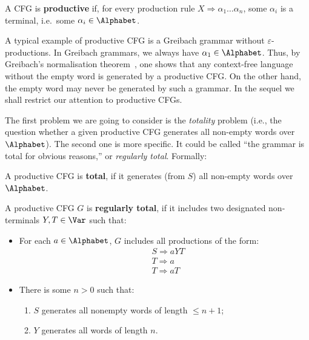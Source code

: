 \documentclass[runningheads]{amsart}
\begin{document}
\begin{definition}
A CFG is \textbf{productive} if, for every production rule $X \Rightarrow \alpha_1 \ldots \alpha_n$, some $\alpha_i$ is a terminal, i.e.\ some $\alpha_i \in \Alphabet$.
\end{definition}

A typical example of productive CFG is a Greibach grammar without $\varepsilon$-pro\-duc\-ti\-ons. In Greibach grammars, we always have $\alpha_1 \in \Alphabet$. Thus, by Greibach's normalisation theorem~\cite{Greibach1965}, one shows that any context-free language without the empty word is generated by a productive CFG. On the other hand, the empty word may never be generated by such a grammar.
In the sequel we shall restrict our attention to productive CFGs.

The first problem we are going to consider is the {\em totality} problem (i.e., the question whether a given productive CFG generates all non-empty words over $\Alphabet$). The second one is more specific. It could be called ``the grammar is total for obvious reasons,'' or {\em regularly total}. 
Formally:


\begin{definition}
\label{def-regtotal}
A productive CFG is \textbf{total}, if it generates (from $S$) all non-empty words over $\Alphabet$.


A productive CFG $G$ is \textbf{regularly total}, if it includes two designated non-terminals $Y,T \in \Var$ such that:
\begin{itemize}
    \item For each $a \in \Alphabet$, $G$ includes all productions of the form:
    \begin{align*}
& S \Rightarrow a Y T \\
& T \Rightarrow a \\
& T \Rightarrow a T 
\end{align*}
\item There is some $n>0$ such that:
\begin{enumerate}
    \item $S$ generates all nonempty words of length $\leq n+1$;
    \item $Y$ generates all words of length $n$.
\end{enumerate}
\end{itemize}

\end{definition}
\end{document}
